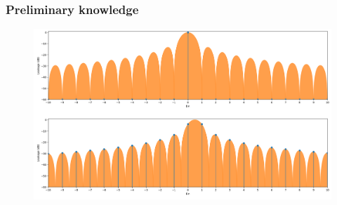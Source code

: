 \documentclass[table]{beamer}
\begin{document}
\begin{frame}
\frametitle{Preliminary knowledge}
    \begin{figure}[H]\vspace{+5mm}
        \includegraphics[width=\linewidth]{figures/winleak.png}
    \end{figure}
\end{frame}
\end{document}
